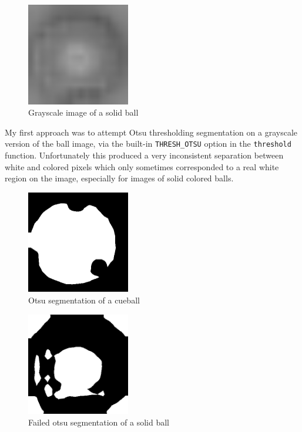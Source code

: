 \begin{figure}[h]
  \centering
  \includegraphics[width=0.4\textwidth]{./imgs/difficult_solid.png}
  \caption{Grayscale image of a solid ball}
\end{figure}

My first approach was to attempt Otsu thresholding segmentation
on a grayscale version of the ball image, 
via the built-in \verb|THRESH_OTSU| option in the \verb|threshold| function.
Unfortunately this produced a very inconsistent separation between white and 
colored pixels which only sometimes corresponded to a real white region 
on the image, especially for images of solid colored balls.

\begin{figure}[h]
  \centering
  \includegraphics[width=0.4\textwidth]{./imgs/cueball_otsu.png}
  \caption{Otsu segmentation of a cueball}
\end{figure}

\begin{figure}[h]
  \centering
  \includegraphics[width=0.4\textwidth]{./imgs/bad_otsu.png}
  \caption{Failed otsu segmentation of a solid ball}
\end{figure}

